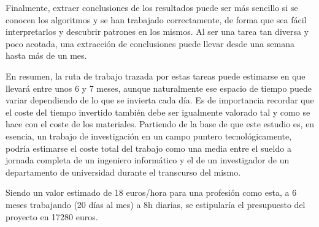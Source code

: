 Finalmente, extraer conclusiones de los resultados puede ser más sencillo si se conocen los algoritmos y se han trabajado correctamente, de forma que sea fácil interpretarlos y descubrir patrones en los mismos. Al ser una tarea tan diversa y poco acotada, una extracción de conclusiones puede llevar desde una semana hasta más de un mes.

En resumen, la ruta de trabajo trazada por estas tareas puede estimarse en que llevará entre unos 6 y 7 meses, aunque naturalmente ese espacio de tiempo puede variar dependiendo de lo que se invierta cada día. Es de importancia recordar que el coste del tiempo invertido también debe ser igualmente valorado tal y como se hace con el coste de los materiales. Partiendo de la base de que este estudio es, en esencia, un trabajo de investigación en un campo puntero tecnológicamente, podría estimarse el coste total del trabajo como una media entre el sueldo a jornada completa de un ingeniero informático y el de un investigador de un departamento de universidad durante el transcurso del mismo.

Siendo un valor estimado de 18 euros/hora para una profesión como esta, a 6 meses trabajando (20 días al mes) a 8h diarias, se estipularía el presupuesto del proyecto en 17280 euros.